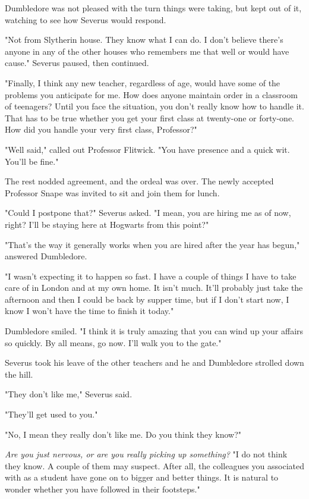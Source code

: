 Dumbledore was not pleased with the turn things were taking, but kept out of it, watching to see how Severus would respond.

"Not from Slytherin house. They know what I can do. I don't believe there's anyone in any of the other houses who remembers me that well or would have cause." Severus paused, then continued.

"Finally, I think any new teacher, regardless of age, would have some of the problems you anticipate for me. How does anyone maintain order in a classroom of teenagers? Until you face the situation, you don't really know how to handle it. That has to be true whether you get your first class at twenty-one or forty-one. How did you handle your very first class, Professor?"

"Well said," called out Professor Flitwick. "You have presence and a quick wit. You'll be fine."

The rest nodded agreement, and the ordeal was over. The newly accepted Professor Snape was invited to sit and join them for lunch.

"Could I postpone that?" Severus asked. "I mean, you are hiring me as of now, right? I'll be staying here at Hogwarts from this point?"

"That's the way it generally works when you are hired after the year has begun," answered Dumbledore.

"I wasn't expecting it to happen so fast. I have a couple of{\el} things I have to take care of in London and at my own home. It isn't much. It'll probably just take the afternoon and then I could be back by supper time, but if I don't start now, I know I won't have the time to finish it today."

Dumbledore smiled. "I think it is truly amazing that you can wind up your affairs so quickly. By all means, go now. I'll walk you to the gate."

Severus took his leave of the other teachers and he and Dumbledore strolled down the hill.

"They don't like me," Severus said.

"They'll get used to you."

"No, I mean they really don't like me. Do you think they know?"

\emph{Are you just nervous, or are you really picking up something?} "I do not think they know. A couple of them may suspect. After all, the colleagues you associated with as a student have gone on to bigger and better things. It is natural to wonder whether you have followed in their footsteps."

